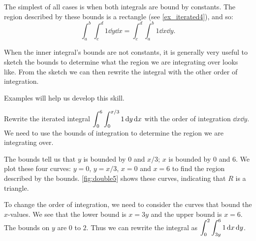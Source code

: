 The simplest of all cases is when both integrals are bound by constants. The region described by these bounds is a rectangle (see \autoref{ex_iterated4}), and so:
\[\int_a^b\int_c^d 1\dd y\dd x = \int_c^d\int_a^b1\dd x\dd y.\]

When the inner integral's bounds are not constants, it is generally very useful to sketch the bounds to determine what the region we are integrating over looks like. From the sketch we can then rewrite the integral with the other order of integration.

Examples will help us develop this skill.

\begin{example}\label{ex_double5}%
Rewrite the iterated integral $\displaystyle \int_0^6\int_0^{x/3} 1\operatorname{d}\! y\operatorname{d}\! x$ with the order of integration $\dd x\dd y$.
\solution
We need to use the bounds of integration to determine the region we are integrating over. %


The bounds tell us that $y$ is bounded by $0$ and $x/3$; $x$ is bounded by 0 and 6. We plot these four curves: $y=0$, $y=x/3$, $x=0$ and $x=6$ to find the region described by the bounds. \autoref{fig:double5} shows these curves, indicating that $R$ is a triangle.

To change the order of integration, we need to consider the curves that bound the $x$-values. We see that the lower bound is $x=3y$ and the upper bound is $x=6$. The bounds on $y$ are $0$ to $2$. Thus we can rewrite the integral as 
$\displaystyle \int_0^2\int_{3y}^6 1\operatorname{d}\! x \operatorname{d}\! y$.
\end{example}

